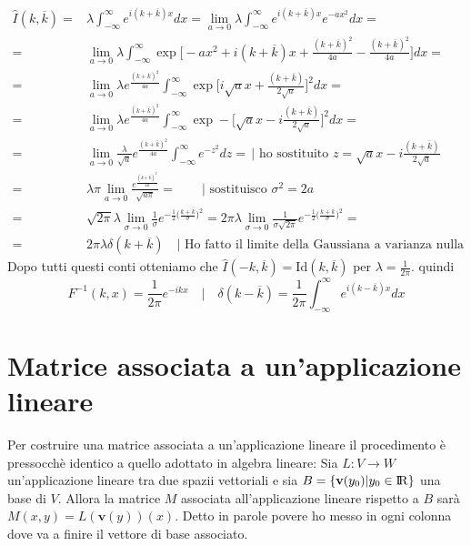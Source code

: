 \documentclass[11pt,a4paper]{report}
\newcommand{\vettore}[1]{\mathbf{#1}}
\theoremstyle{definition}
\theoremstyle{plain}
\theoremstyle{plain}
\begin{document}
			\begin{equation}
			\begin{split}
				\hat I(k,\overline k)=&\lambda\int_{-\infty}^{\infty}e^{i(k+\overline k)x}dx=\lim_{a\to 0}\lambda\int_{-\infty}^{\infty}e^{i(k+\overline k)x}e^{-ax^2}dx=\\
				=&\lim_{a\to 0}\lambda\int_{-\infty}^{\infty}\exp\Bigg[-ax^2 +i(k+\overline k)x+\frac{(k+\overline k)^2}{4a}-\frac{(k+\overline k)^2}{4a}\Bigg]dx=\\
				=&\lim_{a\to 0}\lambda e^\frac{(k+\overline k)^2}{4a}
				\int_{-\infty}^{\infty}\exp\Bigg[i\sqrt ax+\frac{(k+\overline k)}{2\sqrt a}\Bigg]^2dx=\\
				=&\lim_{a\to 0}\lambda e^\frac{(k+\overline k)^2}{4a}
				\int_{-\infty}^{\infty}\exp-\Bigg[\sqrt ax-i\frac{(k+\overline k)}{2\sqrt a}\Bigg]^2dx=\\
				=&\lim_{a\to 0}\frac{\lambda}{\sqrt a} e^\frac{(k+\overline k)^2}{4a}
				\int_{-\infty}^{\infty}e^{-z^2}dz=\, \Bigg|\textrm{ ho sostituito } z=\sqrt ax-i\frac{(k+\overline k)}{2\sqrt a}\\
				=&\lambda \pi \lim_{a\to 0}\frac{e^\frac{(k+\overline k)^2}{4a}}{\sqrt{a\pi}}=\qquad \Bigg|\textrm{ sostituisco } \sigma^2=2a\\
				=& \sqrt{2\pi}\lambda\lim_{\sigma \to 0}\frac{1}{\sigma}e^{-\frac{1}{2}\big(\frac{k+\overline k}{\sigma}\big)^2}=
				2\pi\lambda\lim_{\sigma \to 0}\frac{1}{\sigma\sqrt{2\pi}}e^{-\frac{1}{2}\big(\frac{k+\overline k}{\sigma}\big)^2}=\\
				=&2\pi\lambda \delta(k+\overline k)\quad \Bigg| \textrm{ Ho fatto il limite della Gaussiana a varianza nulla}
			\end{split}
			\end{equation}
			Dopo tutti questi conti otteniamo che $\hat I(-k,\overline k)=\textrm{Id}(k,\overline k)$ per $\lambda=\frac{1}{2\pi}$. quindi
			\begin{equation}
				F^{-1}(k,x)=\frac{1}{2\pi}e^{-ikx}\quad \Bigg| \quad\delta(k-\overline k)=\frac{1}{2\pi}\int_{-\infty}^{\infty}e^{i(k-\overline k)x}dx
			\end{equation}




		\section{Matrice associata a un'applicazione lineare}
			Per costruire una matrice associata a un'applicazione lineare il procedimento è pressocchè identico a quello adottato in algebra lineare:\newline
			Sia $L:V\rightarrow W$ un'applicazione lineare tra due spazii vettoriali e sia $B=\{\vettore v(y_0)|y_0\in \rm I\!R\}$ una base di $V$. Allora la matrice $M$ associata all'applicazione lineare rispetto a $B$ sarà $M(x,y)=L(\vettore v(y))(x)$.\newline
			Detto in parole povere ho messo in ogni colonna dove va a finire il vettore di base associato.\newline
\end{document}
